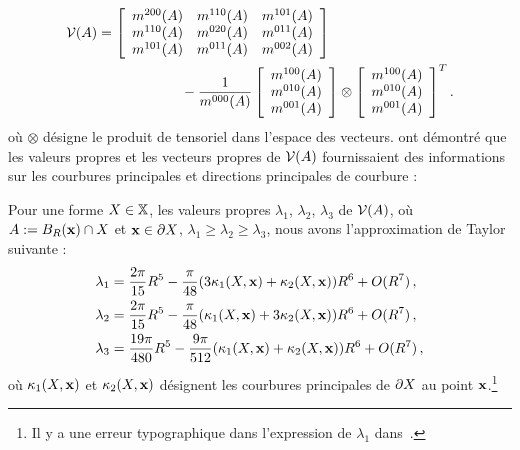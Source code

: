 \begin{align}
  \mathcal{V}(A) &=  \left\lbrack
    \begin{array}{ccc}
      m^{200}(A) & m^{110}(A) & m^{101}(A)\\
      m^{110}(A) & m^{020}(A) & m^{011}(A)\\
      m^{101}(A) & m^{011}(A) & m^{002}(A)
    \end{array}
    \right\rbrack\quad\quad\quad\quad\quad\quad \nonumber \\
    &\quad\quad\quad\quad\quad\quad- \frac{1}{m^{000}(A)}
    \left\lbrack
    \begin{array}{c}
      m^{100}(A) \\
      m^{010}(A) \\
      m^{001}(A) \\
    \end{array}
    \right\rbrack
    \otimes
    \left\lbrack
    \begin{array}{c}
      m^{100}(A) \\
      m^{010}(A) \\
      m^{001}(A) \\
    \end{array}
    \right\rbrack^T.
\label{eq:defCov}
\end{align}
%
où $\otimes$ désigne le produit de tensoriel dans l'espace des vecteurs.
%
 ont démontré que les valeurs propres et les
vecteurs propres de $\mathcal{V}(A)$ fournissaient des informations sur les courbures
principales et directions principales de courbure :
\begin{lemma}
 \label{lem:pottmann-3d}
 Pour une forme $X \in \mathbb{X}$, les valeurs propres $\lambda_1$,
 $\lambda_2$, $\lambda_3$ de $\mathcal{V}(A)$, où $ A := B_{R}(\mathbf{x}) \cap
 X$ et $\mathbf{x} \in \partial X$, $\lambda_1 \ge \lambda_2 \ge
 \lambda_3$, nous avons l'approximation de Taylor suivante :
 \begin{align}
   \lambda_1& = \frac{2\pi}{15}R^5 - \frac{\pi}{48}(3\kappa_{1}(X,\mathbf{x}) + \kappa_{2}(X,\mathbf{x}))R^6 + O(R^7)\,,\\
   \lambda_2& = \frac{2\pi}{15}R^5 - \frac{\pi}{48}(\kappa_{1}(X,\mathbf{x}) + 3\kappa_{2}(X,\mathbf{x}))R^6 + O(R^7)\,,\\
   \lambda_3& = \frac{19\pi}{480}R^5 - \frac{9\pi}{512}(\kappa_{1}(X,\mathbf{x}) + \kappa_{2}(X,\mathbf{x}))R^6 + O(R^7)\,,
 \end{align}
 où $\kappa_{1}(X,\mathbf{x})$ et $\kappa_{2}(X,\mathbf{x})$ désignent les
 courbures principales de  $\partial X$ au point $\mathbf{x}$.\footnote{Il y a une
 erreur typographique dans l'expression de $\lambda_1$ dans~\cite{Pottmann2007}.}
\end{lemma}
